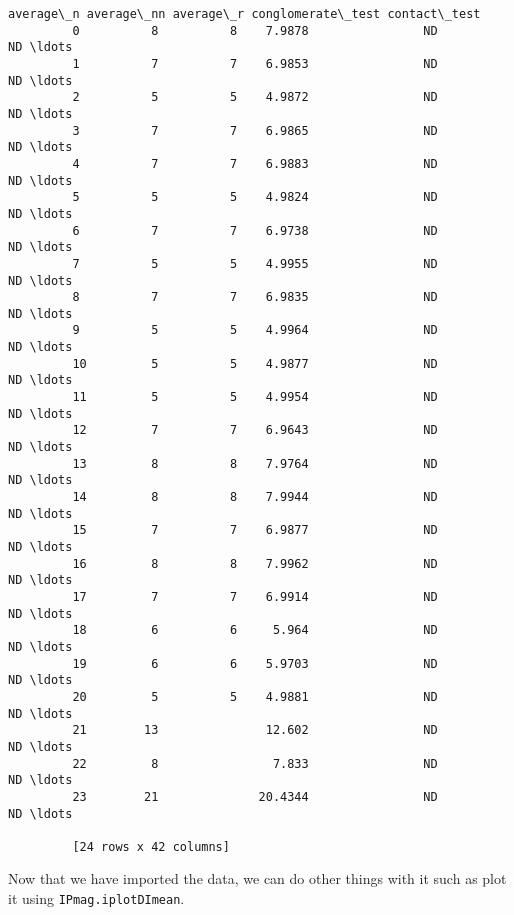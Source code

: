 \documentclass{article}
\begin{document}
\begin{Verbatim}[commandchars=\\\{\}]
            average\_n average\_nn average\_r conglomerate\_test contact\_test      
         0          8          8    7.9878                ND           ND \ldots  
         1          7          7    6.9853                ND           ND \ldots  
         2          5          5    4.9872                ND           ND \ldots  
         3          7          7    6.9865                ND           ND \ldots  
         4          7          7    6.9883                ND           ND \ldots  
         5          5          5    4.9824                ND           ND \ldots  
         6          7          7    6.9738                ND           ND \ldots  
         7          5          5    4.9955                ND           ND \ldots  
         8          7          7    6.9835                ND           ND \ldots  
         9          5          5    4.9964                ND           ND \ldots  
         10         5          5    4.9877                ND           ND \ldots  
         11         5          5    4.9954                ND           ND \ldots  
         12         7          7    6.9643                ND           ND \ldots  
         13         8          8    7.9764                ND           ND \ldots  
         14         8          8    7.9944                ND           ND \ldots  
         15         7          7    6.9877                ND           ND \ldots  
         16         8          8    7.9962                ND           ND \ldots  
         17         7          7    6.9914                ND           ND \ldots  
         18         6          6     5.964                ND           ND \ldots  
         19         6          6    5.9703                ND           ND \ldots  
         20         5          5    4.9881                ND           ND \ldots  
         21        13               12.602                ND           ND \ldots  
         22         8                7.833                ND           ND \ldots  
         23        21              20.4344                ND           ND \ldots  
         
         [24 rows x 42 columns]
\end{Verbatim}
        
    Now that we have imported the data, we can do other things with it such
as plot it using \texttt{IPmag.iplotDImean}.
\end{document}
